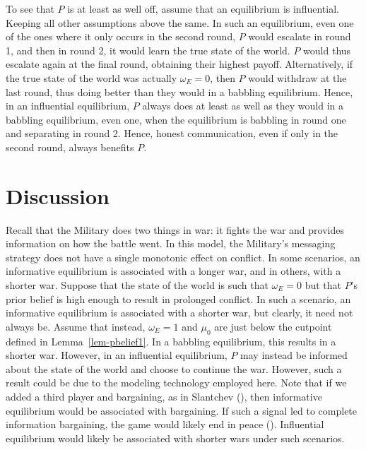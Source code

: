 \documentclass[
  12pt,
]{article}
\theoremstyle{plain}
\theoremstyle{plain}
\theoremstyle{remark}
\begin{document}
To see that \(P\) is at least as well off, assume that an equilibrium is
influential. Keeping all other assumptions above the same. In such an
equilibrium, even one of the ones where it only occurs in the second
round, \(P\) would escalate in round 1, and then in round 2, it would
learn the true state of the world. \(P\) would thus escalate again at
the final round, obtaining their highest payoff. Alternatively, if the
true state of the world was actually \(\omega_E = 0\), then \(P\) would
withdraw at the last round, thus doing better than they would in a
babbling equilibrium. Hence, in an influential equilibrium, \(P\) always
does at least as well as they would in a babbling equilibrium, even one,
when the equilibrium is babbling in round one and separating in round 2.
Hence, honest communication, even if only in the second round, always
benefits \(P\).

\section{Discussion}\label{discussion}

Recall that the Military does two things in war: it fights the war and
provides information on how the battle went. In this model, the
Military's messaging strategy does not have a single monotonic effect on
conflict. In some scenarios, an informative equilibrium is associated
with a longer war, and in others, with a shorter war. Suppose that the
state of the world is such that \(\omega_E = 0\) but that \(P\)'s prior
belief is high enough to result in prolonged conflict. In such a
scenario, an informative equilibrium is associated with a shorter war,
but clearly, it need not always be. Assume that instead,
\(\omega_E = 1\) and \(\mu_0\) are just below the cutpoint defined in
Lemma~\ref{lem-pbelief1}. In a babbling equilibrium, this results in a
shorter war. However, in an influential equilibrium, \(P\) may instead
be informed about the state of the world and choose to continue the war.
However, such a result could be due to the modeling technology employed
here. Note that if we added a third player and bargaining, as in
Slantchev
(), then
informative equilibrium would be associated with bargaining. If such a
signal led to complete information bargaining, the game would likely end
in peace (). Influential equilibrium would likely be associated with shorter
wars under such scenarios.
\end{document}

